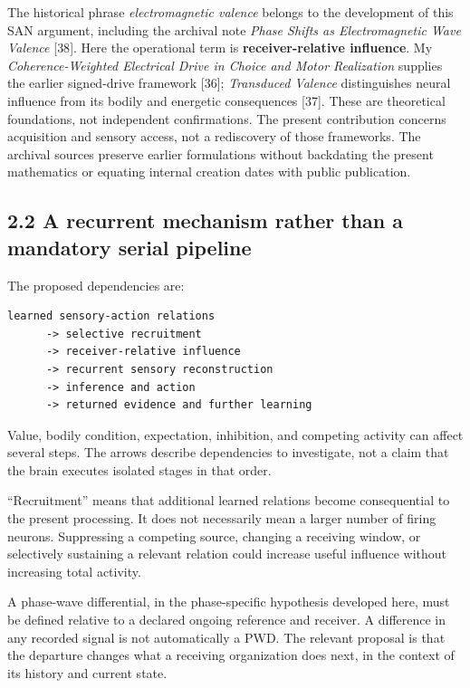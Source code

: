 \documentclass[
  american,
  11pt,
  letterpaper,
]{article}
\begin{document}
The historical phrase \emph{electromagnetic valence} belongs to the development of this SAN argument, including the archival note \emph{Phase Shifts as Electromagnetic Wave Valence} {[}38{]}. Here the operational term is \textbf{receiver-relative influence}. My \emph{Coherence-Weighted Electrical Drive in Choice and Motor Realization} supplies the earlier signed-drive framework {[}36{]}; \emph{Transduced Valence} distinguishes neural influence from its bodily and energetic consequences {[}37{]}. These are theoretical foundations, not independent confirmations. The present contribution concerns acquisition and sensory access, not a rediscovery of those frameworks. The archival sources preserve earlier formulations without backdating the present mathematics or equating internal creation dates with public publication.

\subsection{2.2 A recurrent mechanism rather than a mandatory serial pipeline}\label{a-recurrent-mechanism-rather-than-a-mandatory-serial-pipeline}

The proposed dependencies are:

\begin{verbatim}
learned sensory-action relations
      -> selective recruitment
      -> receiver-relative influence
      -> recurrent sensory reconstruction
      -> inference and action
      -> returned evidence and further learning
\end{verbatim}

Value, bodily condition, expectation, inhibition, and competing activity can affect several steps. The arrows describe dependencies to investigate, not a claim that the brain executes isolated stages in that order.

``Recruitment'' means that additional learned relations become consequential to the present processing. It does not necessarily mean a larger number of firing neurons. Suppressing a competing source, changing a receiving window, or selectively sustaining a relevant relation could increase useful influence without increasing total activity.

A phase-wave differential, in the phase-specific hypothesis developed here, must be defined relative to a declared ongoing reference and receiver. A difference in any recorded signal is not automatically a PWD. The relevant proposal is that the departure changes what a receiving organization does next, in the context of its history and current state.
\end{document}

